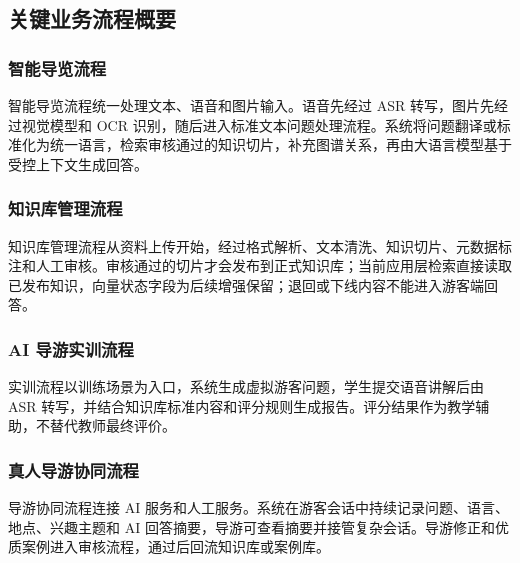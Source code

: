 
\subsection{关键业务流程概要}

\subsubsection{智能导览流程}

智能导览流程统一处理文本、语音和图片输入。语音先经过 ASR 转写，图片先经过视觉模型和 OCR 识别，随后进入标准文本问题处理流程。系统将问题翻译或标准化为统一语言，检索审核通过的知识切片，补充图谱关系，再由大语言模型基于受控上下文生成回答。

\newpage
\subsubsection{知识库管理流程}

知识库管理流程从资料上传开始，经过格式解析、文本清洗、知识切片、元数据标注和人工审核。审核通过的切片才会发布到正式知识库；当前应用层检索直接读取已发布知识，向量状态字段为后续增强保留；退回或下线内容不能进入游客端回答。

\newpage
\subsubsection{AI 导游实训流程}

实训流程以训练场景为入口，系统生成虚拟游客问题，学生提交语音讲解后由 ASR 转写，并结合知识库标准内容和评分规则生成报告。评分结果作为教学辅助，不替代教师最终评价。

\newpage
\subsubsection{真人导游协同流程}

导游协同流程连接 AI 服务和人工服务。系统在游客会话中持续记录问题、语言、地点、兴趣主题和 AI 回答摘要，导游可查看摘要并接管复杂会话。导游修正和优质案例进入审核流程，通过后回流知识库或案例库。

\newpage
